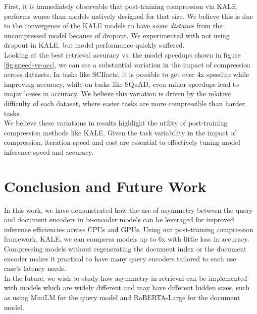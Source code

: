 First, it is immediately observable that post-training compression via KALE performs worse than models natively designed for that size. We believe this is due to the convergence of the KALE models to have \textit{some distance} from the uncompressed model because of dropout. We experimented with not using dropout in KALE, but model performance quickly suffered. \\
Looking at the best retrieval accuracy vs. the model speedups shown in figure \ref{fig:speed-vs-acc}, we can see a substantial variation in the impact of compression across datasets. In tasks like SCIfacts, it is possible to get over 4x speedup while improving accuracy, while on tasks like SQuAD, even minor speedups lead to major losses in accuracy. We believe this variation is driven by the relative difficulty of each dataset, where easier tasks are more compressible than harder tasks. \\
We believe these variations in results highlight the utility of post-training compression methods like KALE. Given the task variability in the impact of compression, iteration speed and cost are essential to effectively tuning model inference speed and accuracy. 
\section{Conclusion and Future Work}
In this work, we have demonstrated how the use of asymmetry between the query and document encoders in bi-encoder models can be leveraged for improved inference efficiencies across CPUs and GPUs. Using our post-training compression framework, KALE, we can compress models up to 6x with little loss in accuracy. Compressing models without regenerating the document index or the document encoder makes it practical to have many query encoders tailored to each use case's latency needs. \\
In the future, we wish to study how asymmetry in retrieval can be implemented with models which are widely different and may have different hidden sizes, such as using MiniLM for the query model and RoBERTA-Large for the document model. 